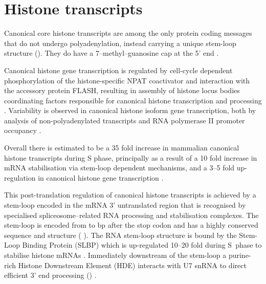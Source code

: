 \section{Histone transcripts}


  Canonical core histone transcripts are among the only protein coding messages
  that do not undergo polyadenylation,
  instead carrying a unique stem-loop structure ().
  They do have a 7--methyl--guanosine cap at the 5' end \citep{MarzluffNatRevGen2008}.

  Canonical histone gene transcription is regulated
  by cell-cycle dependent phosphorylation of the histone-specific NPAT coactivator
  and interaction with the accessory protein FLASH,
  resulting in assembly of histone locus bodies
  coordinating factors responsible for canonical histone transcription and processing
  \citep{MarzluffNatRevGen2008,RattrayMueller2012,Hoefig2014}.
  Variability is observed in canonical histone isoform gene transcription,
  both by analysis of non-polyadenylated transcripts \citep{YangGenomeBiol2011}
  and RNA polymerase II promoter occupancy \citep{Ederveen2011}.

  Overall there is estimated to be a 35 fold increase in mammalian
  canonical histone transcripts during S phase,
  principally as a result of a 10 fold increase in mRNA stabilisation
  via stem-loop dependent mechanisms,
  and a 3--5 fold up-regulation in canonical histone gene transcription \citep{HarrisMCB1991}.

  This post-translation regulation of canonical histone transcripts
  is achieved by a stem-loop encoded in the mRNA 3' untranslated region
  that is recognised by specialised spliceosome--related RNA
  processing and stabilisation complexes.
  The stem-loop is encoded from \StemLoopStart{} to \StemLoopEnd{} bp after the stop codon
  and has a highly conserved sequence and structure
  ( \citep{stem-loop-structure}).
  The RNA stem-loop structure is bound by the Stem-Loop Binding Protein (SLBP)
  which is up-regulated 10--20 fold during S~phase to stabilise
  histone mRNAs \citep{SLBP-regulation}.
  Immediately downstream of the stem-loop a purine-rich Histone Downstream Element (HDE)
  interacts with U7 snRNA to direct efficient 3' end
  processing () \citep{HDE-sequence}.

